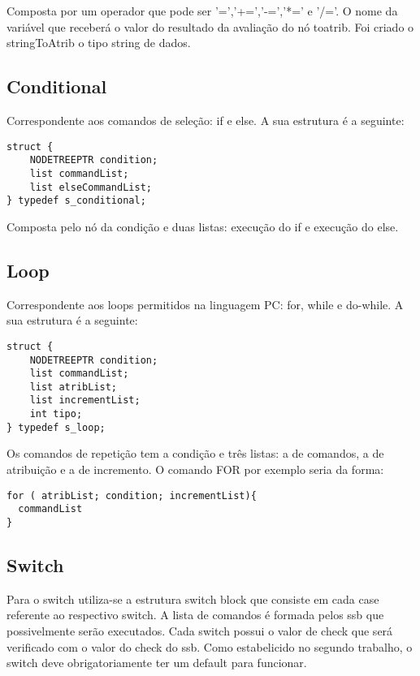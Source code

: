 \documentclass[a4paper,10pt]{article}
\begin{document}
Composta por um operador que pode ser '=','+=','-=','*=' e '/='. O nome da variável que receberá o valor do resultado da avaliação do nó toatrib. Foi criado o
stringToAtrib o tipo string de dados. 

\subsection{Conditional}

Correspondente aos comandos de seleção: if e else. A sua estrutura é a seguinte:

\begin{lstlisting}
struct {
	NODETREEPTR condition;
	list commandList;
	list elseCommandList;
} typedef s_conditional;
\end{lstlisting}

Composta pelo nó da condição e duas listas: execução do if e execução do else. 

\subsection{Loop}

Correspondente aos loops permitidos na linguagem PC: for, while e do-while. A sua estrutura é a seguinte:

\begin{lstlisting}
struct {
	NODETREEPTR condition;
	list commandList;
	list atribList;
	list incrementList;
	int tipo;
} typedef s_loop;
\end{lstlisting}

Os comandos de repetição tem a condição e três listas: a de comandos, a de atribuição e a de incremento. O comando FOR por exemplo seria da forma:

\begin{lstlisting}
for ( atribList; condition; incrementList){
  commandList
}
\end{lstlisting}

\subsection{Switch}

Para o switch utiliza-se a estrutura switch block que consiste em cada case referente ao respectivo switch. A lista de comandos é formada pelos ssb que possivelmente serão executados.
Cada switch possui o valor de check que será verificado com o valor do check do ssb. Como estabelicido no segundo trabalho, o switch deve obrigatoriamente ter um default para funcionar.
\end{document}

